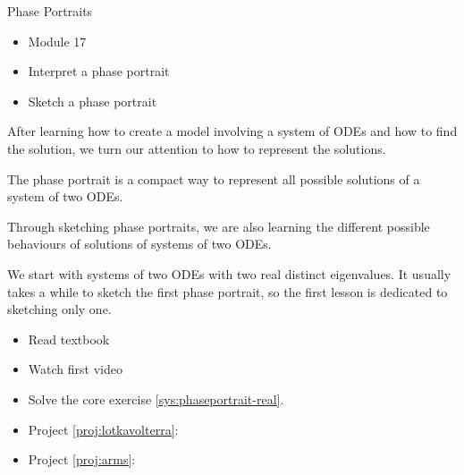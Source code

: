 	





\standardonlynewpage

%
%



\begin{module}{Phase Portraits}
	\label{sys:phase}

	
	
\end{module}



\begin{lesson}

	\begin{itemize}
		\item Module 17
	\end{itemize}

	\begin{itemize}
		\item Interpret a phase portrait
		\item Sketch a phase portrait
	\end{itemize}
	



After learning how to create a model involving a system of ODEs and how to find the solution, we turn our attention to how to represent the solutions.

The phase portrait is a compact way to represent all possible solutions of a system of two ODEs. 

Through sketching phase portraits, we are also learning the different possible behaviours of solutions of systems of two ODEs. 

We start with systems of two ODEs with two real distinct eigenvalues.
It usually takes a while to sketch the first phase portrait, so the first lesson is dedicated to sketching only one.

\begin{itemize}
	\item Read textbook
	\item Watch first video
	\item Solve the core exercise \ref{sys:phaseportrait-real}.
\end{itemize}


\begin{itemize}
	\item Project \ref{proj:lotkavolterra}: \lotkavolterratitle
	\item Project \ref{proj:arms}: \armstitle
\end{itemize}


\end{lesson}




